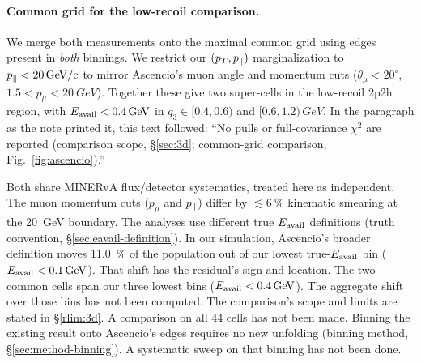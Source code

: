 \paragraph{Common grid for the low-recoil comparison.} We merge both measurements onto the maximal common grid using edges present in \emph{both} binnings. We restrict our $(p_{T},p_{\parallel})$ marginalization to $p_{\parallel}<\SI{20}{GeV/c}$ to mirror Ascencio's muon angle and momentum cuts ($\theta_\mu<20^{\circ}$, $1.5<p_\mu<\SI{20}{GeV}$). Together these give two super-cells in the low-recoil 2p2h region, with $E_{\mathrm{avail}}<\SI{0.4}{GeV}$ in $q_{3}\in[0.4,0.6)$ and $[0.6,1.2)\,\si{GeV}$. In the paragraph as the note printed it, this text followed: ``No pulls or full-covariance $\chi^{2}$ are reported (comparison scope, \S\ref{sec:3d}; common-grid comparison, Fig.~\ref{fig:ascencio}).''\par Both share MINERvA flux/detector systematics, treated here as independent. The muon momentum cuts ($p_\mu$ and $p_{\parallel}$) differ by $\lesssim\SI{6}{\percent}$ kinematic smearing at the \SI{20}{GeV} boundary. The analyses use different true $E_{\mathrm{avail}}$ definitions (truth convention, \S\ref{sec:eavail-definition}). In our simulation, Ascencio's broader definition moves \SI{11.0}{\percent} of the population out of our lowest true-$E_{\mathrm{avail}}$ bin ($E_{\mathrm{avail}}<\SI{0.1}{GeV}$). That shift has the residual's sign and location. The two common cells span our three lowest bins ($E_{\mathrm{avail}}<\SI{0.4}{GeV}$). The aggregate shift over those bins has not been computed. The comparison's scope and limits are stated in \S\ref{rlim:3d}. A comparison on all 44 cells has not been made. Binning the existing result onto Ascencio's edges requires no new unfolding (binning method, \S\ref{sec:method-binning}). A systematic sweep on that binning has not been done.
